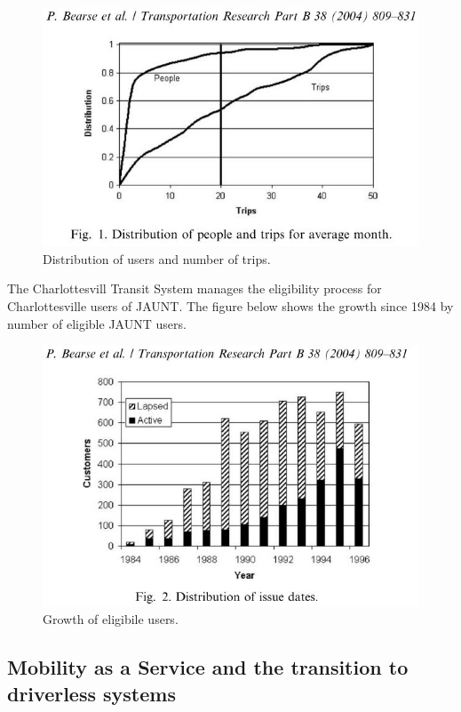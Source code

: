 \documentclass[
]{article}
\begin{document}
\begin{figure}
\centering
\includegraphics{images/bearse_people_trips_distribution.JPG}
\caption{Distribution of users and number of trips.}
\end{figure}

The Charlottesvill Transit System manages the eligibility process for
Charlottesville users of JAUNT. The figure below shows the growth since
1984 by number of eligible JAUNT users.

\begin{figure}
\centering
\includegraphics{images/bearse_lapsed_population_growth.JPG}
\caption{Growth of eligibile users.}
\end{figure}

\hypertarget{mobility-as-a-service-and-the-transition-to-driverless-systems}{%
\subsection{Mobility as a Service and the transition to driverless
systems}\label{mobility-as-a-service-and-the-transition-to-driverless-systems}}
\end{document}
